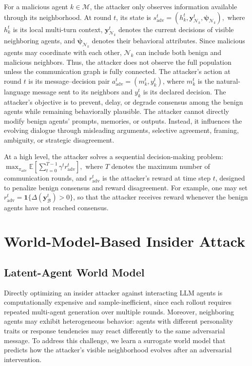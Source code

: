 \documentclass{article}
\theoremstyle{plain}
\theoremstyle{definition}
\theoremstyle{remark}
\begin{document}
For a malicious agent $k\in\mathcal{M}$, the attacker only observes information available through its neighborhood. At round $t$, its state is
$s_{\mathrm{adv}}^t
=
\left(
h_k^t,
\mathbf{y}_{\mathcal{N}_k}^t,
\boldsymbol{\psi}_{\mathcal{N}_k}
\right),$
where $h_k^t$ is its local multi-turn context, $\mathbf{y}_{\mathcal{N}_k}^t$ denotes the current decisions of visible neighboring agents, and $\boldsymbol{\psi}_{\mathcal{N}_k}$ denotes their behavioral attributes. Since malicious agents may coordinate with each other, $\mathcal{N}_k$ can include both benign and malicious neighbors. Thus, the attacker does not observe the full population unless the communication graph is fully connected. The attacker's action at round $t$ is its message--decision pair $a_{\mathrm{adv}}^t=(m_k^t,y_k^t)$, where $m_k^t$ is the natural-language message sent to its neighbors and $y_k^t$ is its declared decision.  The attacker's objective is to prevent, delay, or degrade consensus among the benign agents while remaining behaviorally plausible. The attacker cannot directly modify benign agents' prompts, memories, or outputs. Instead, it influences the evolving dialogue through misleading arguments, selective agreement, framing, ambiguity, or strategic disagreement.

At a high level, the attacker solves a sequential decision-making problem:
$\max_{\pi_{\mathrm{adv}}}
\mathbb{E}
\left[
\sum_{t=0}^{T-1}\gamma^t r_{\mathrm{adv}}^t
\right],$
where \(T\) denotes the maximum number of communication rounds, and \(r_{\mathrm{adv}}^t\) is the attacker's reward at time step \(t\), designed to penalize benign consensus and reward disagreement. For example, one may set \(r_{\mathrm{adv}}^t=\mathbf{1}\{\Delta(\mathbf{y}_{\mathcal{B}}^t)>0\}\), so that the attacker receives reward whenever the benign agents have not reached consensus.

\section{World-Model-Based Insider Attack}

\subsection{Latent-Agent World Model}

Directly optimizing an insider attacker against interacting LLM agents is computationally expensive and sample-inefficient, since each rollout requires repeated multi-agent generation over multiple rounds. Moreover, neighboring agents may exhibit heterogeneous behavior: agents with different personality traits or response tendencies may react differently to the same adversarial message. To address this challenge, we learn a surrogate world model that predicts how the attacker's visible neighborhood evolves after an adversarial intervention.
\end{document}
